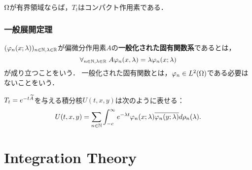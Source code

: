 \documentclass[uplatex,dvipdfmx]{jsreport}
\begin{document}
\begin{corollary}
    $\Omega$が有界領域ならば，$T_t$はコンパクト作用素である．
\end{corollary}

\subsection{一般展開定理}

\begin{definition}
    $(\varphi_n(x;\lambda))_{n\in\mathbb{N},\lambda\in\mathbb{R}}$が偏微分作用素$A$の\textbf{一般化された固有関数系}であるとは，
    \[\forall_{n\in\mathbb{N},\lambda\in\mathbb{R}}\;A\varphi_n(x,\lambda)=\lambda\varphi_n(x;\lambda)\]
    が成り立つことをいう．
    一般化された固有関数とは，$\varphi_n\in L^2(\Omega)$である必要はないことをいう．
\end{definition}

\begin{theorem}[一般展開定理]
    
\end{theorem}

\begin{theorem}
    $T_t=e^{-t\widetilde{A}}$を与える積分核$U(t,x,y)$は次のように表せる：
    \[U(t,x,y)=\sum_{n\in\mathbb{N}}\int_{-c}^\infty e^{-\lambda t}\varphi_n(x;\lambda)\overline{\varphi_n(y;\lambda)}d\rho_n(\lambda).\]
\end{theorem}

\chapter{Integration Theory}
\end{document}
